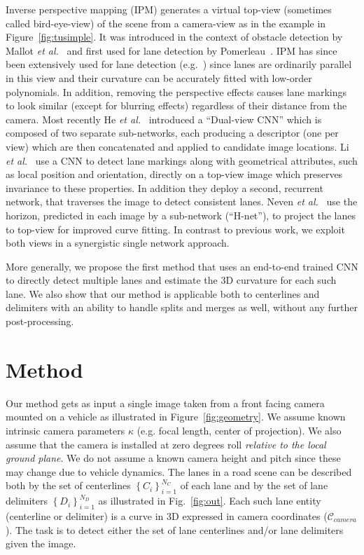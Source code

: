 \documentclass[10pt,twocolumn,letterpaper]{article}
\begin{document}
Inverse perspective mapping (IPM) generates a virtual top-view (sometimes called bird-eye-view) of the scene from a camera-view as in the example in Figure~\ref{fig:tusimple}. It was introduced in the context of obstacle detection by Mallot \textit{et al.}~\cite{Mallot} and first used for lane detection by Pomerleau~\cite{Pomerleau}. IPM has since been extensively used for lane detection (e.g.~\cite{Borkar,Aly}) since lanes are ordinarily parallel in this view and their curvature can be accurately fitted with low-order polynomials. In addition, removing the perspective effects causes lane markings to look similar (except for blurring effects) regardless of their distance from the camera. Most recently He \textit{et al.}~\cite{He} introduced a ``Dual-view CNN'' which is composed of two separate sub-networks, each producing a descriptor (one per view) which are then concatenated and applied to candidate image locations. Li \textit{et al.}~\cite{Li} use a CNN to detect lane markings along with geometrical attributes, such as local position and orientation, directly on a top-view image which preserves invariance to these properties. In addition they deploy a second, recurrent network, that traverses the image to detect consistent lanes. Neven \textit{et al.}~\cite{neven} use the horizon, predicted in each image by a sub-network (``H-net''), to project the lanes to top-view for improved curve fitting. In contrast to previous work, we exploit both views in a synergistic single network approach.

More generally, we propose the first method that uses an end-to-end trained CNN to directly detect multiple lanes and estimate the 3D curvature for each such lane. We also show that our method is applicable both to centerlines and delimiters with an ability to handle splits and merges as well, without any further post-processing. 

\section{Method}



Our method gets as input a single image taken from a front facing camera mounted on a vehicle as illustrated in Figure~\ref{fig:geometry}. We assume known intrinsic camera parameters $\kappa$ (e.g. focal length, center of projection). We also assume that the camera is installed at zero degrees roll \textit{relative to the local ground plane}. We do not assume a known camera height and pitch since these may change due to vehicle dynamics. The lanes in a road scene can be described both by the set of centerlines $\left\lbrace C_i\right\rbrace_{i=1}^{N_C}$ of each lane and by the set of lane delimiters $\left\lbrace D_i\right\rbrace_{i=1}^{N_D}$ as illustrated in Fig.~\ref{fig:out}. Each such lane entity (centerline or delimiter) is a curve in 3D expressed in camera coordinates ($\mathcal{C}_{camera}$).  The task is to detect either the set of lane centerlines and/or lane delimiters given the image.
\end{document}
